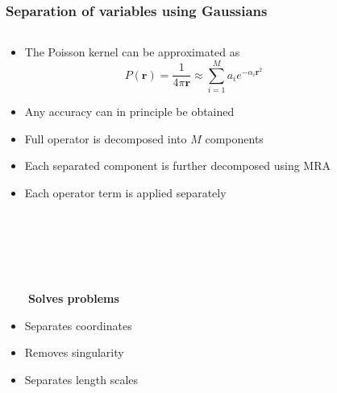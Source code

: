 \documentclass[mathserif, 8pt]{beamer}
\begin{document}
\begin{frame}
    \frametitle{Separation of variables using Gaussians}
    \begin{columns}
    \begin{column}{.50\textwidth}
    \begin{itemize}
	\item The Poisson kernel can be approximated as
	    \begin{equation}
		\nonumber
		P(\boldsymbol{r}) = \frac{1}{4\pi\boldsymbol{r}} \approx \sum_{i=1}^M a_i e^{-\alpha_i \boldsymbol{r}^2} 
	    \end{equation}
	\item Any accuracy can in principle be obtained
	\item Full operator is decomposed into $M$ components
	\item Each separated component is further decomposed using MRA
	\item Each operator term is applied separately
    \end{itemize}
    \ \\
    \ \\
    \ \\
    \ \\
    \ \\
    \pause
    \pause
    \pause
    \pause
    \pause
    \pause
    \pause
    \ \ \ \ \textbf{Solves problems}
    \begin{itemize}
	\item	Separates coordinates
	\item	Removes singularity
	\item	Separates length scales
    \end{itemize}
    \end{column}
    \begin{column}{.50\textwidth}
	\only<1,2,3,4,5>{\ \\}

\end{column}
\end{columns}
\end{frame}
\end{document}
